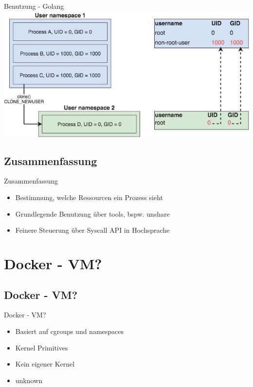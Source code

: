 \documentclass[14pt]{beamer}
\begin{document}
    \begin{frame}{Benutzung - Golang}
   	\centering\includegraphics[scale=.4]{logo/user-ns}
    \end{frame}
   
    \subsection{Zusammenfassung}
    \begin{frame}{Zusammenfassung}
    \begin{itemize}
    \item Bestimmung, welche Ressourcen ein Prozess sieht
    \item Grundlegende Benutzung über tools, bspw. unshare
    \item Feinere Steuerung über Syscall API in Hochsprache
    \end{itemize}
    \end{frame}
   
    \section{Docker - VM?}
    \subsection{Docker - VM?}
   \begin{frame}{Docker - VM?}
    \begin{itemize}
    \item Basiert auf cgroups und namespaces
    \item Kernel Primitives
    \item Kein eigener Kernel
    \item {}\tiny unknown
    \end{itemize}
    \end{frame}
    
\end{document}

